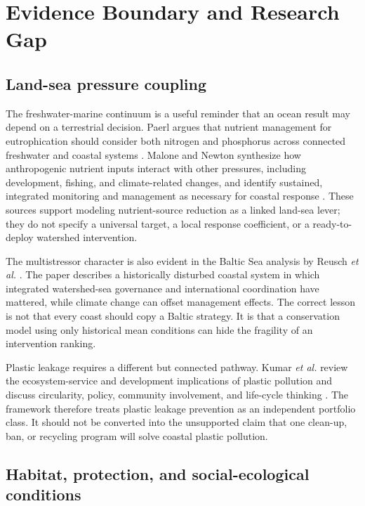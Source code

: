 \documentclass[conference]{IEEEtran}
\begin{document}
\section{Evidence Boundary and Research Gap}

\subsection{Land-sea pressure coupling}

The freshwater-marine continuum is a useful reminder that an ocean result may depend on a terrestrial decision. Paerl argues that nutrient management for eutrophication should consider both nitrogen and phosphorus across connected freshwater and coastal systems \cite{paerl2009}. Malone and Newton synthesize how anthropogenic nutrient inputs interact with other pressures, including development, fishing, and climate-related changes, and identify sustained, integrated monitoring and management as necessary for coastal response \cite{malone2020}. These sources support modeling nutrient-source reduction as a linked land-sea lever; they do not specify a universal target, a local response coefficient, or a ready-to-deploy watershed intervention.

The multistressor character is also evident in the Baltic Sea analysis by Reusch \emph{et al.} \cite{reusch2018}. The paper describes a historically disturbed coastal system in which integrated watershed-sea governance and international coordination have mattered, while climate change can offset management effects. The correct lesson is not that every coast should copy a Baltic strategy. It is that a conservation model using only historical mean conditions can hide the fragility of an intervention ranking.

Plastic leakage requires a different but connected pathway. Kumar \emph{et al.} review the ecosystem-service and development implications of plastic pollution and discuss circularity, policy, community involvement, and life-cycle thinking \cite{kumar2021}. The framework therefore treats plastic leakage prevention as an independent portfolio class. It should not be converted into the unsupported claim that one clean-up, ban, or recycling program will solve coastal plastic pollution.

\subsection{Habitat, protection, and social-ecological conditions}
\end{document}
